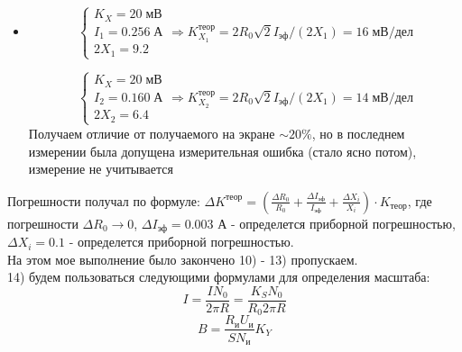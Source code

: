 \documentclass[a4paper,12pt]{extarticle}
\begin{document}
\begin{itemize}
    \begin{equation*}
    \begin{cases}
        K_X = 50 \;\text{мВ}
        \\
        I_2 = 1.03 \;\text{А}
        \\
        2 X_2 = 7.4 
    \end{cases}
    \Rightarrow 
    K_{X_2}^{\text{теор}} = 2R_0 \sqrt{2} I_{\text{эф}}/(2X_1) = 39.5 \;\text{мВ/дел}
    \end{equation*}
    Получаем отличие от получаемого на экране $\sim20\%$
    \item 
    \begin{equation*}
    \begin{cases}
        K_X = 20 \;\text{мВ}
        \\
        I_1 = 0.256 \;\text{А}
        \\
        2 X_1 = 9.2 
    \end{cases}
    \Rightarrow 
    K_{X_1}^{\text{теор}} = 2R_0 \sqrt{2} I_{\text{эф}}/(2X_1) = 16 \;\text{мВ/дел}
    \end{equation*}

    \begin{equation*}
    \begin{cases}
        K_X = 20 \;\text{мВ}
        \\
        I_2 = 0.160 \;\text{А}
        \\
        2 X_2 = 6.4 
    \end{cases}
    \Rightarrow 
    K_{X_2}^{\text{теор}} = 2R_0 \sqrt{2} I_{\text{эф}}/(2X_1) = 14 \;\text{мВ/дел}
    \end{equation*}
    Получаем отличие от получаемого на экране $\sim20\%$, но в последнем измерении была допущена измерительная ошибка (стало ясно потом), измерение не учитывается
\end{itemize}

Погрешности получал по формуле: $\Delta K^{\text{теор}} = \left( \frac{\Delta R_0}{R_0} + \frac{\Delta I_{\text{эф}}}{I_{\text{эф}}} + \frac{\Delta X_i}{X_i}\right) \cdot K_{\text{теор}}$, где погрешности $\Delta R_0 \rightarrow 0$, $\Delta I_{\text{эф}} = 0.003$ А - определется приборной погрешностью, $\Delta X_i = 0.1$  - определется приборной погрешностью. \\ 
На этом мое выполнение было закончено 10) - 13) пропускаем. \\
14) будем пользоваться следующими формулами для определения масштаба: 
\begin{equation*}
    I = \frac{I N_0}{2 \pi R} = \frac{K_S N_0}{R_0 2\pi R}
\end{equation*}
\begin{equation*}
    B = \frac{R_{\text{и}} U_{\text{и}}}{S N_{\text{и}}} K_Y
\end{equation*}
\end{document}
